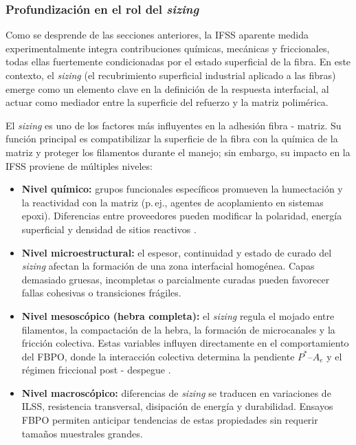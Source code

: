 \subsubsection{Profundización en el rol del \textit{sizing}}

Como se desprende de las secciones anteriores, la IFSS aparente medida experimentalmente integra
contribuciones químicas, mecánicas y friccionales, todas ellas fuertemente condicionadas por el
estado superficial de la fibra. En este contexto, el \textit{sizing} (el recubrimiento superficial
industrial aplicado a las fibras) emerge como un elemento clave en la definición de la respuesta
interfacial, al actuar como mediador entre la superficie del refuerzo y la matriz polimérica.

El \textit{sizing} es uno de los factores más influyentes en la adhesión fibra - matriz. Su función
principal es compatibilizar la superficie de la fibra con la química de la matriz y proteger los
filamentos durante el manejo; sin embargo, su impacto en la IFSS proviene de múltiples niveles:

\begin{itemize}
    \item \textbf{Nivel químico:} grupos funcionales específicos promueven la humectación y la
    reactividad con la matriz (p.\,ej., agentes de acoplamiento en sistemas epoxi). Diferencias
    entre proveedores pueden modificar la polaridad, energía superficial y densidad de sitios
    reactivos \cite{AhmadvashAghbash2024IMR}.

    \item \textbf{Nivel microestructural:} el espesor, continuidad y estado de curado del
    \textit{sizing} afectan la formación de una zona interfacial homogénea. Capas demasiado gruesas,
    incompletas o parcialmente curadas pueden favorecer fallas cohesivas o transiciones frágiles.

    \item \textbf{Nivel mesoscópico (hebra completa):} el \textit{sizing} regula el mojado entre
    filamentos, la compactación de la hebra, la formación de microcanales y la fricción colectiva. Estas
    variables influyen directamente en el comportamiento del FBPO, donde la interacción colectiva
    determina la pendiente \(P^{\ast}\)–\(A_e\) y el régimen friccional post - despegue
    \cite{DeLeon2022}.

    \item \textbf{Nivel macroscópico:} diferencias de \textit{sizing} se traducen en variaciones de
    ILSS, resistencia transversal, disipación de energía y durabilidad. Ensayos FBPO permiten
    anticipar tendencias de estas propiedades sin requerir tamaños muestrales grandes.
\end{itemize}

